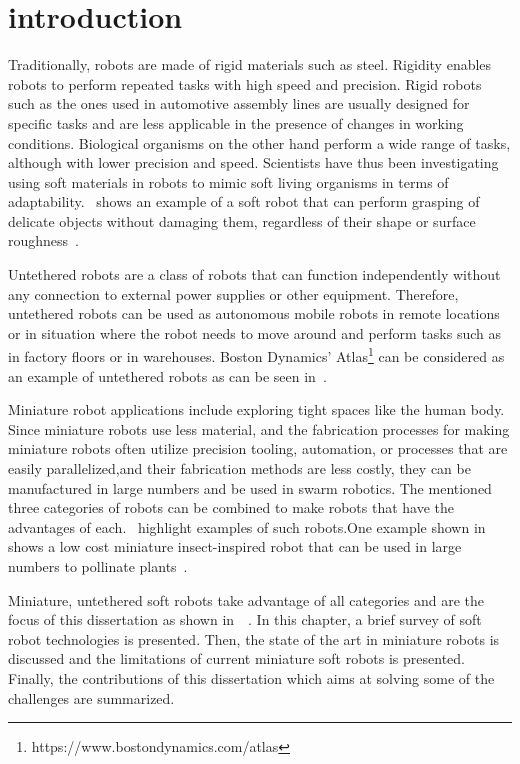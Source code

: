 \graphicspath{{Images/intro/}}
\chapter{introduction}
\label{chap:intro}
Traditionally, robots are made of rigid materials such as steel. Rigidity enables robots to perform repeated tasks with high speed and precision. Rigid robots such as the ones used in automotive assembly lines are usually designed for specific tasks and are less applicable in the presence of changes in working conditions. Biological organisms on the other hand perform a wide range of tasks, although with lower precision and speed. Scientists have thus been investigating using soft materials in robots to mimic soft living organisms in terms of adaptability.~ shows an example of a soft robot that can perform grasping of delicate objects without damaging them, regardless of their shape or surface roughness~\cite{Li2019}.

Untethered robots are a class of robots that can function independently without any connection to external power supplies or other equipment. Therefore, untethered robots can be used as autonomous mobile robots in remote locations or in situation where the robot needs to move around and perform tasks such as in factory floors or in warehouses. Boston Dynamics' Atlas\footnote{https://www.bostondynamics.com/atlas\label{fn:boston}} can be considered as an example of untethered robots as can be seen in~. 

Miniature robot applications include exploring tight spaces like the human body. Since miniature robots use less material, and the fabrication processes for making miniature robots often utilize precision tooling, automation, or processes that are easily parallelized,and their fabrication methods are less costly, they can be manufactured in large numbers and be used in swarm robotics. The mentioned three categories of robots can be combined to make robots that have the advantages of each.~ highlight examples of such robots.One example shown in~ shows a low cost miniature insect-inspired robot that can be used in large numbers to pollinate plants~\cite{Jafferis2019}. 

Miniature, untethered soft robots take advantage of all categories and are the focus of this dissertation as shown in~~\cite{Khodambashi2021untethered}. In this chapter, a brief survey of soft robot technologies is presented. Then, the state of the art in miniature robots is discussed and the limitations of current miniature soft robots is presented. Finally, the contributions of this dissertation which aims at solving some of the challenges are summarized.
 
